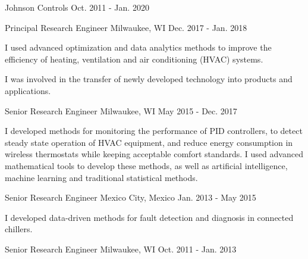 

\begin{cventries}

\cvmultientry
{Johnson Controls} %
{}
{Oct. 2011 - Jan. 2020} %
{
\cvsubentry
{Principal Research Engineer} %
{Milwaukee, WI} %
{Dec. 2017 - Jan. 2018} %
{
\begin{cvitems} %
\item {I used advanced optimization and data analytics methods to improve the efficiency of heating, ventilation and air conditioning (HVAC) systems.}
\item {I was involved in the transfer of newly developed technology into products and applications.}
\end{cvitems}
}
\cvsubentry
{Senior Research Engineer} %
{Milwaukee, WI} %
{May 2015 - Dec. 2017} %
{
\begin{cvitems} %
\item {I developed methods for monitoring the performance of PID controllers, to detect steady state operation of HVAC equipment, and reduce energy consumption in wireless thermostats while keeping acceptable comfort standards. I used advanced mathematical tools to develop these methods, as well as artificial intelligence, machine learning and traditional statistical methods.}
\end{cvitems}
}
\cvsubentry
{Senior Research Engineer} %
{Mexico City, Mexico} %
{Jan. 2013 - May 2015} %
{
\begin{cvitems} %
\item {I developed data-driven methods for fault detection and diagnosis in connected chillers.}
\end{cvitems}
}
\cvsubentry
{Senior Research Engineer} %
{Milwaukee, WI} %
{Oct. 2011 - Jan. 2013} %
{
\begin{cvitems} %

\end{cvitems}}}
\end{cventries}
